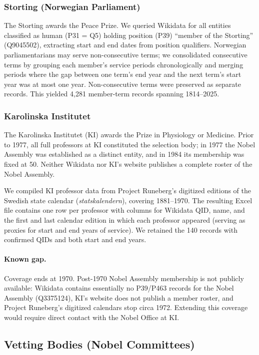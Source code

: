 \subsubsection{Storting (Norwegian Parliament)}

The Storting awards the Peace Prize. We queried Wikidata for all entities
classified as human (P31 = Q5) holding position (P39) ``member of the
Storting'' (Q9045502), extracting start and end dates from position
qualifiers. Norwegian parliamentarians may serve non-consecutive terms;
we consolidated consecutive terms by grouping each member's service
periods chronologically and merging periods where the gap between one
term's end year and the next term's start year was at most one year.
Non-consecutive terms were preserved as separate records. This yielded
4{,}281 member-term records spanning 1814--2025.

\subsubsection{Karolinska Institutet}

The Karolinska Institutet (KI) awards the Prize in Physiology or Medicine.
Prior to 1977, all full professors at KI constituted the selection body;
in 1977 the Nobel Assembly was established as a distinct entity, and in 1984
its membership was fixed at 50. Neither Wikidata nor KI's website publishes
a complete roster of the Nobel Assembly.

We compiled KI professor data from Project Runeberg's digitized editions of
the Swedish state calendar (\emph{statskalendern}), covering 1881--1970.
The resulting Excel file contains one row per professor with columns for
Wikidata QID, name, and the first and last calendar edition in which each
professor appeared (serving as proxies for start and end years of service).
We retained the 140 records with confirmed QIDs and both start and end years.

\paragraph{Known gap.} Coverage ends at 1970. Post-1970 Nobel Assembly
membership is not publicly available: Wikidata contains essentially no
P39/P463 records for the Nobel Assembly (Q3375124), KI's website does not
publish a member roster, and Project Runeberg's digitized calendars stop
circa 1972. Extending this coverage would require direct contact with the
Nobel Office at KI.

\subsection{Vetting Bodies (Nobel Committees)}\label{sec:vetting}

